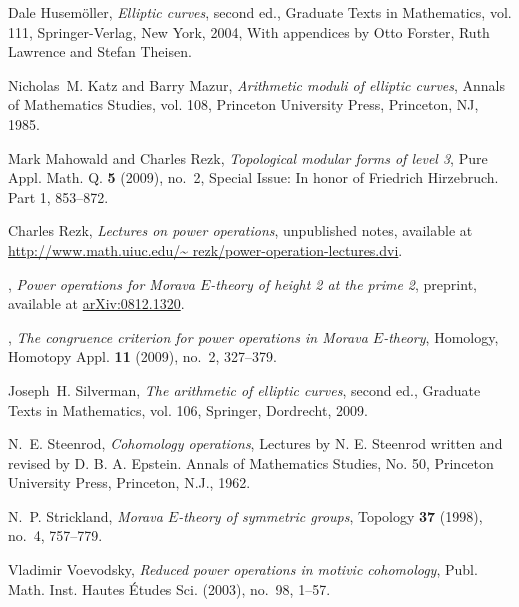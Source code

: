 \documentclass{gtpart}
\theoremstyle{definition}
\theoremstyle{remark}
\begin{document}
\begin{thebibliography}
Dale Husem{\"o}ller, \emph{Elliptic curves}, second ed., Graduate Texts in
  Mathematics, vol. 111, Springer-Verlag, New York, 2004, With appendices by
  Otto Forster, Ruth Lawrence and Stefan Theisen. 

Nicholas~M. Katz and Barry Mazur, \emph{Arithmetic moduli of elliptic curves},
  Annals of Mathematics Studies, vol. 108, Princeton University Press,
  Princeton, NJ, 1985. 

Mark Mahowald and Charles Rezk, \emph{Topological modular forms of level 3},
  Pure Appl. Math. Q. \textbf{5} (2009), no.~2, Special Issue: In honor of
  Friedrich Hirzebruch. Part 1, 853--872. 

Charles Rezk, \emph{Lectures on power operations}, unpublished notes, available
  at
  \href{http://www.math.uiuc.edu/~rezk/power-operation-lectures.dvi}{http://www.math.uiuc.edu/\textasciitilde
  rezk/power-operation-lectures.dvi}.

\bysame, \emph{Power operations for {M}orava ${E}$-theory of height 2 at the
  prime 2}, preprint, available at
  \href{http://arxiv.org/abs/0812.1320}{arXiv:0812.1320}.

\bysame, \emph{The congruence criterion for power operations in {M}orava
  {$E$}-theory}, Homology, Homotopy Appl. \textbf{11} (2009), no.~2, 327--379.

Joseph~H. Silverman, \emph{The arithmetic of elliptic curves}, second ed.,
  Graduate Texts in Mathematics, vol. 106, Springer, Dordrecht, 2009.

N.~E. Steenrod, \emph{Cohomology operations}, Lectures by N. E. Steenrod
  written and revised by D. B. A. Epstein. Annals of Mathematics Studies, No.
  50, Princeton University Press, Princeton, N.J., 1962. 

N.~P. Strickland, \emph{Morava {$E$}-theory of symmetric groups}, Topology
  \textbf{37} (1998), no.~4, 757--779. 

Vladimir Voevodsky, \emph{Reduced power operations in motivic cohomology},
  Publ. Math. Inst. Hautes \'Etudes Sci. (2003), no.~98, 1--57. 

\end{thebibliography}
\end{document}
